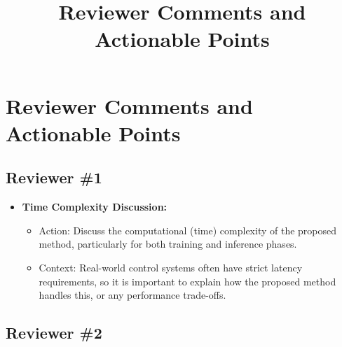 \documentclass{article}
\begin{document}
\title{Reviewer Comments and Actionable Points}
\author{}
\date{}
\maketitle

\section*{Reviewer Comments and Actionable Points}

\subsection*{Reviewer \#1}

\begin{itemize}
    \item \textbf{Time Complexity Discussion:} 
    \begin{itemize}
        \item Action: Discuss the computational (time) complexity of the proposed method, particularly for both training and inference phases.
        \item Context: Real-world control systems often have strict latency requirements, so it is important to explain how the proposed method handles this, or any performance trade-offs.
    \end{itemize}
\end{itemize}

\subsection*{Reviewer \#2}
\end{document}
